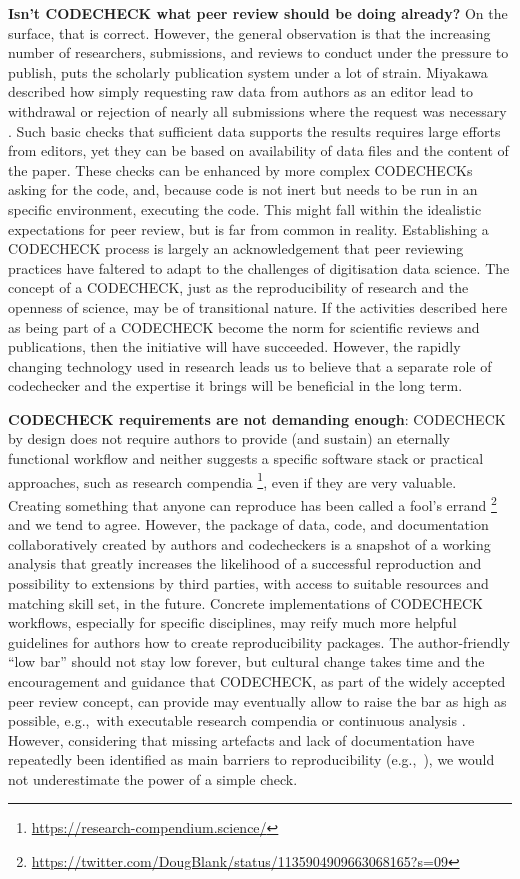 \documentclass[12pt]{article}
\begin{document}
\textbf{Isn't CODECHECK what peer review should be doing already?}
On the surface, that is correct.
However, the general observation is that the
increasing number of researchers, submissions, and reviews to conduct
under the pressure to publish, puts the scholarly publication system
under a lot of strain.  
Miyakawa described how simply requesting raw data from authors as an 
editor lead to withdrawal or rejection of nearly all submissions where the
request was necessary \cite{miyakawa_no_2020}. Such basic checks that
sufficient data supports the results requires large efforts from editors,
yet they can be based on availability of data files and the content of the
paper. These checks can be enhanced by more complex CODECHECKs asking for
the code, and, because code is not inert but needs to be run in an specific
environment, executing the code.
This might fall within the idealistic expectations for peer review,
but is far from common in reality.
Establishing a CODECHECK
process is largely an acknowledgement that peer reviewing practices
have faltered to adapt to the challenges of digitisation data science.
The concept of a CODECHECK,
just as the reproducibility of research and the openness of science,
may be of transitional nature. If the activities described here as
being part of a CODECHECK become the norm for scientific reviews and
publications, then the initiative will have succeeded.  However, the
rapidly changing technology used in research leads us to believe that
a separate role of codechecker and the expertise it brings will be
beneficial in the long term.

\textbf{CODECHECK requirements are not demanding enough}:
CODECHECK by design does not require authors to provide (and sustain) an
eternally functional workflow and neither suggests a specific software stack
or practical approaches, such as research compendia
\footnote{\url{https://research-compendium.science/}},
even if they are very valuable.
Creating something that anyone can reproduce has been called a 
fool's errand
\footnote{\url{https://twitter.com/DougBlank/status/1135904909663068165?s=09}}
and we tend to agree.
However, the package of data, code, and documentation
collaboratively created by authors and codecheckers is a snapshot of a 
working analysis that greatly increases the likelihood of a successful 
reproduction and possibility to extensions by third parties, with access
to suitable resources and matching skill set, in the future.
Concrete implementations of CODECHECK workflows, especially for specific
disciplines, may reify much more helpful guidelines for authors how to
create reproducibility packages.
The author-friendly ``low bar'' should not stay low forever, but cultural
change takes time and the encouragement and guidance that CODECHECK,
as part of the widely accepted peer review concept, can provide may
eventually allow to raise the bar as high as possible, e.g.,~with
executable research compendia \cite{nust_opening_2017}
or continuous analysis \cite{beaulieu-jones_reproducibility_2017-1}.
However, considering that missing artefacts and lack of documentation
have repeatedly been identified as main barriers to reproducibility
(e.g.,~\cite{stagge_assessing_2019,nust_improving_2020}),
we would not underestimate the power of a simple check.
\end{document}
